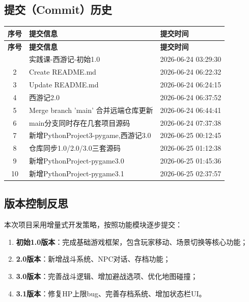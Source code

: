 \documentclass[a4paper,12pt]{article}
\begin{document}
\subsection{提交（Commit）历史}

\begin{longtable}{|c|l|l|}
\hline
\textbf{序号} & \textbf{提交信息} & \textbf{提交时间} \\
\hline
\endfirsthead
\hline
\textbf{序号} & \textbf{提交信息} & \textbf{提交时间} \\
\hline
\endhead
\hline
\endfoot
1 & 实践课-西游记-初始1.0 & 2026-06-24 03:29:30 \\
\hline
2 & Create README.md & 2026-06-24 06:22:32 \\
\hline
3 & Update README.md & 2026-06-24 06:24:15 \\
\hline
4 & 西游记2.0 & 2026-06-24 06:37:52 \\
\hline
5 & Merge branch 'main' 合并远端仓库更新 & 2026-06-24 06:44:41 \\
\hline
6 & main分支同时存在几套项目源码 & 2026-06-24 07:37:38 \\
\hline
7 & 新增PythonProject3-pygame,西游记3.0 & 2026-06-25 00:12:45 \\
\hline
8 & 仓库同步1.0/2.0/3.0三套源码 & 2026-06-25 01:12:38 \\
\hline
9 & 新增PythonProject-pygame3.0 & 2026-06-25 01:45:36 \\
\hline
10 & 新增PythonProject-pygame3.1 & 2026-06-25 02:37:57 \\
\hline
\end{longtable}

\subsection{版本控制反思}

本次项目采用增量式开发策略，按照功能模块逐步提交：

\begin{enumerate}[label=(\arabic*)]
    \item \textbf{初始1.0版本}：完成基础游戏框架，包含玩家移动、场景切换等核心功能；
    \item \textbf{2.0版本}：新增战斗系统、NPC对话、存档功能；
    \item \textbf{3.0版本}：完善战斗逻辑、增加避战选项、优化地图碰撞；
    \item \textbf{3.1版本}：修复HP上限bug、完善存档系统、增加状态栏UI。
\end{enumerate}
\end{document}
